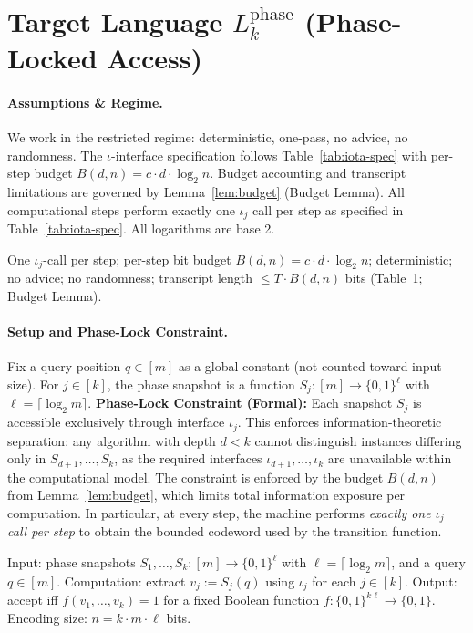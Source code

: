 \section{Target Language \texorpdfstring{$L_k^{\text{phase}}$}{Lkphase} (Phase-Locked Access)}
\label{Lkphase:sec}

\paragraph{Assumptions \& Regime.}
We work in the restricted regime: deterministic, one-pass, no advice, no randomness. The $\iota$-interface specification follows Table~\ref{tab:iota-spec} with per-step budget $B(d,n) = c \cdot d \cdot \log_{2} n$. Budget accounting and transcript limitations are governed by Lemma~\ref{lem:budget} (Budget Lemma). All computational steps perform exactly one $\iota_j$ call per step as specified in Table~\ref{tab:iota-spec}. All logarithms are base 2.

\begin{tcolorbox}[title=Mini-Recap, colback=white]
One $\iota_j$-call per step; per-step bit budget $B(d,n)=c\cdot d\cdot \log_{2} n$; deterministic; no advice; no randomness; transcript length $\le T\cdot B(d,n)$ bits (Table~1; Budget Lemma).
\end{tcolorbox}

\paragraph{Setup and Phase-Lock Constraint.}
Fix a query position $q\in[m]$ as a global constant (not counted toward input size). For $j\in[k]$, the phase snapshot is a function $S_j:[m]\to\{0,1\}^{\ell}$ with $\ell=\lceil\log_{2} m\rceil$. \textbf{Phase-Lock Constraint (Formal):} Each snapshot $S_j$ is accessible exclusively through interface $\iota_j$. This enforces information-theoretic separation: any algorithm with depth $d<k$ cannot distinguish instances differing only in $S_{d+1},\ldots,S_k$, as the required interfaces $\iota_{d+1},\ldots,\iota_k$ are unavailable within the computational model. The constraint is enforced by the budget $B(d,n)$ from Lemma~\ref{lem:budget}, which limits total information exposure per computation. In particular, at every step, the machine performs \emph{exactly one $\iota_j$ call per step} to obtain the bounded codeword used by the transition function.

\begin{definition}
\label{Lkphase:def:language}
Input: phase snapshots $S_1,\ldots,S_k:[m]\to\{0,1\}^{\ell}$ with $\ell=\lceil\log_{2} m\rceil$, and a query $q\in[m]$. Computation: extract $v_j:=S_j(q)$ using $\iota_j$ for each $j\in[k]$. Output: accept iff $f(v_1,\ldots,v_k)=1$ for a fixed Boolean function $f:\{0,1\}^{k\ell}\to\{0,1\}$. Encoding size: $n=k\cdot m\cdot \ell$ bits.
\end{definition}

